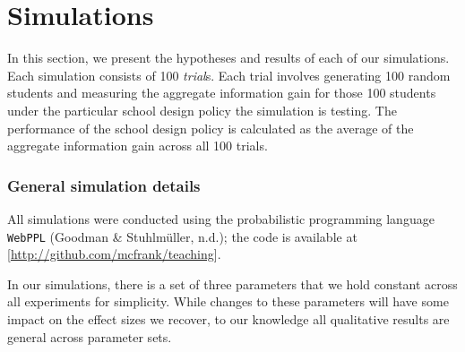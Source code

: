 \documentclass[10pt, letterpaper]{article}
\begin{document}
\section{Simulations}\label{simulations}

In this section, we present the hypotheses and results of each of our
simulations. Each simulation consists of 100 \emph{trial}s. Each trial
involves generating 100 random students and measuring the aggregate
information gain for those 100 students under the particular school
design policy the simulation is testing. The performance of the school
design policy is calculated as the average of the aggregate information
gain across all 100 trials.

\subsubsection{General simulation
details}\label{general-simulation-details}

All simulations were conducted using the probabilistic programming
language \texttt{WebPPL} (Goodman \& Stuhlmüller, n.d.); the code is
available at {[}\url{http://github.com/mcfrank/teaching}{]}.

In our simulations, there is a set of three parameters that we hold
constant across all experiments for simplicity. While changes to these
parameters will have some impact on the effect sizes we recover, to our
knowledge all qualitative results are general across parameter sets.
\end{document}
